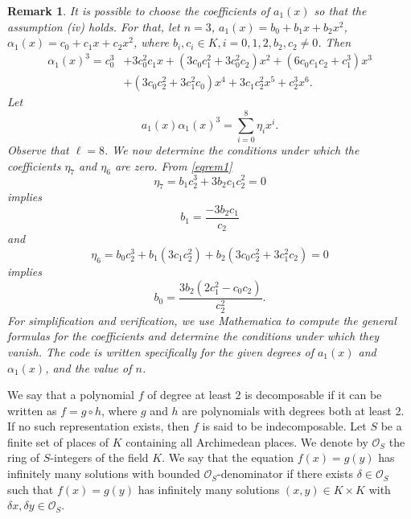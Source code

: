 \documentclass[12pt]{amsart}
\newtheorem{remark}[theorem]{Remark}
\begin{document}
     \begin{remark}
         It is possible to choose the coefficients of $a_1(x)$ so that the assumption (iv) holds. For that, let $n=3$, $a_1(x)=b_0+b_1x+b_2x^2$, $\alpha_1(x)=c_0+c_1x+c_2x^2$, where $b_i,c_i\in K, i=0,1,2, b_2,c_2\neq 0$. Then 
         \begin{align*}
             \alpha_1(x)^3=c_0^3&+3c_0^2c_1x+(3c_0c_1^2+3c_0^2c_2)x^2+(6c_0c_1c_2+c_1^3)x^3\\&+(3c_0c_2^2+3c_1^2c_0)x^4+3c_1c_2^2x^5+c_2^3x^6.
         \end{align*}
         Let 
         \begin{equation}\label{eqrem1}
             a_1(x)\alpha_1(x)^3=\sum_{i=0}^{8}\eta_ix^i.
         \end{equation} Observe that $\ell=8$. We now determine the conditions under which the coefficients $\eta_7$ and $\eta_6$ are zero. From \eqref{eqrem1} 
         \begin{equation*}
             \eta_7=b_1c_2^3+3b_2c_1c_2^2=0
         \end{equation*} implies 
         \begin{equation*}
             b_1=\frac{-3b_2c_1}{c_2}
         \end{equation*} and 
         \begin{equation*}
             \eta_6=b_0c_2^3+b_1(3c_1c_2^2)+b_2(3c_0c_2^2+3c_1^2c_2)=0 
         \end{equation*} implies 
         \begin{equation*}
             b_0=\frac{3b_2(2c_1^2-c_0c_2)}{c_2^2}. 
         \end{equation*} For simplification and verification, we use \textit{Mathematica} to compute the general formulas for the coefficients and determine the conditions under which they vanish. The code is written specifically for the given degrees of $a_1(x)$ and $\alpha_1(x)$, and the value of $n$.
 
     \end{remark}
	
	We say that a polynomial $f$ of degree at least 2 is decomposable if it can be written as $f=g\circ h$, where $g$ and $h$ are polynomials with degrees both at least 2. If no such representation exists, then $f$ is said to be indecomposable. Let $S$ be a finite set of places of $K$ containing all Archimedean places. We denote by $\mathcal{O}_S$ the ring of $S$-integers of the field $K$. We say that the equation $f(x)=g(y)$ has infinitely many solutions with bounded $\mathcal{O}_S$-denominator if there exists $\delta\in \mathcal{O}_S$ such that $f(x)=g(y)$ has infinitely many solutions $(x,y)\in K\times K$ with $\delta x,\delta y\in \mathcal{O}_S$.
\end{document}
